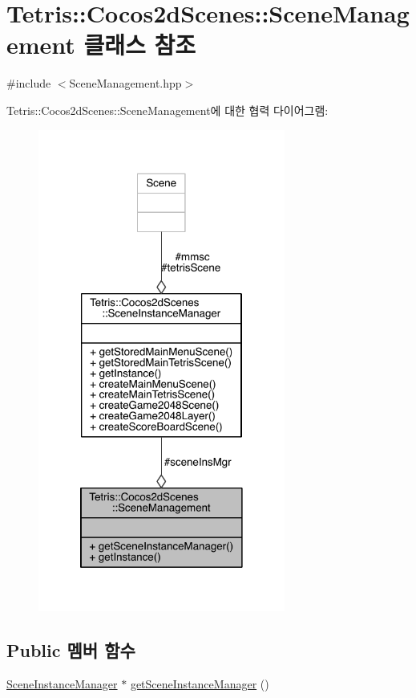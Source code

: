 \hypertarget{class_tetris_1_1_cocos2d_scenes_1_1_scene_management}{}\section{Tetris\+:\+:Cocos2d\+Scenes\+:\+:Scene\+Management 클래스 참조}
\label{class_tetris_1_1_cocos2d_scenes_1_1_scene_management}


{\ttfamily \#include $<$Scene\+Management.\+hpp$>$}



Tetris\+:\+:Cocos2d\+Scenes\+:\+:Scene\+Management에 대한 협력 다이어그램\+:
\nopagebreak
\begin{figure}[H]
\begin{center}
\leavevmode
\includegraphics[width=230pt]{class_tetris_1_1_cocos2d_scenes_1_1_scene_management__coll__graph}
\end{center}
\end{figure}
\subsection*{Public 멤버 함수}
\begin{DoxyCompactItemize}
\item 
\hyperlink{class_tetris_1_1_cocos2d_scenes_1_1_scene_instance_manager}{Scene\+Instance\+Manager} $\ast$ \hyperlink{class_tetris_1_1_cocos2d_scenes_1_1_scene_management_a4a4ea58177afffd49857182c961eb5f3}{get\+Scene\+Instance\+Manager} ()
\end{DoxyCompactItemize}
